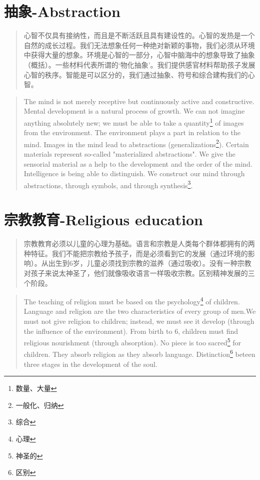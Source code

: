 \documentclass[lang=cn,10pt]{elegantbook}
\begin{document}
\chapter{抽象-Abstraction}

\begin{quote}
  {\small 心智不仅具有接纳性，而且是不断活跃且具有建设性的。心智的发热是一个自然的成长过程。我们无法想象任何一种绝对新颖的事物，我们必须从环境中获得大量的想象。环境是心智的一部分，心智中脑海中的想象导致了抽象（概括）。一些材料代表所谓的‘物化抽象’。我们提供感官材料帮助孩子发展心智的秩序。智能是可以区分的，我们通过抽象、符号和综合建构我们的心智。}
\end{quote}

\begin{tcolorbox}
  \begin{quote}
    {\small The mind is not merely receptive but continuously active and constructive. Mental development is a natural process of growth. We can not imagine anything absolutely new; we must be able to take a quantity\footnote{数量、大量} of images from the environment. The environment plays a part in relation to the mind. Images in the mind lead to abstractions (generalizations\footnote{一般化、归纳}). Certain materials represent so-called "materialized abstractions". We give the sensorial material as a help to the development and the order of the mind. Intelligence is being able to distinguish. We construct our mind through abstractions, through symbols, and through synthesis\footnote{综合}.}
  \end{quote}
\end{tcolorbox}

\chapter{宗教教育-Religious education}

\begin{quote}
  {\small 宗教教育必须以儿童的心理为基础。语言和宗教是人类每个群体都拥有的两种特征。我们不能把宗教给予孩子，而是必须看到它的发展（通过环境的影响）。从出生到6岁，儿童必须找到宗教的滋养（通过吸收）。没有一种宗教对孩子来说太神圣了，他们就像吸收语言一样吸收宗教。区别精神发展的三个阶段。}
\end{quote}

\begin{tcolorbox}
  \begin{quote}
    {\small The teaching of religion must be based on the psychology\footnote{心理} of children. Language and religion are the two characteristics of every group of men.We must not give religion to children; instead, we must see it develop (through the influence of the environment). From birth to 6, children must find religious nourishment (through absorption). No piece is too sacred\footnote{神圣的} for children. They absorb religion as they absorb language. Distinction\footnote{区别} beteen three stages in the development of the soul.}
  \end{quote}
\end{tcolorbox}
\end{document}

